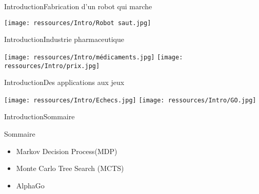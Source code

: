 \begin{frame}{Introduction}{Fabrication d'un robot qui marche}
	\begin{center}
		\texttt{[image: ressources/Intro/Robot saut.jpg]}
	\end{center}
\end{frame}
\begin{frame}{Introduction}{Industrie pharmaceutique}
	\begin{center}
		\texttt{[image: ressources/Intro/médicaments.jpg]}
		\texttt{[image: ressources/Intro/prix.jpg]}
	\end{center}
\end{frame}
\begin{frame}{Introduction}{Des applications aux jeux}
	\begin{center}
		\texttt{[image: ressources/Intro/Echecs.jpg]}
		\texttt{[image: ressources/Intro/GO.jpg]}
	\end{center}
\end{frame}
\begin{frame}{Introduction}{Sommaire}
	\begin{center}
		\begin{block}{Sommaire}
			\begin{itemize}[label=\textbullet, font=\LARGE \color{black}]
				\item Markov Decision Process(MDP)
				\item Monte Carlo Tree Search (MCTS)
				\item AlphaGo
			\end{itemize}
		\end{block}
	\end{center}
\end{frame}